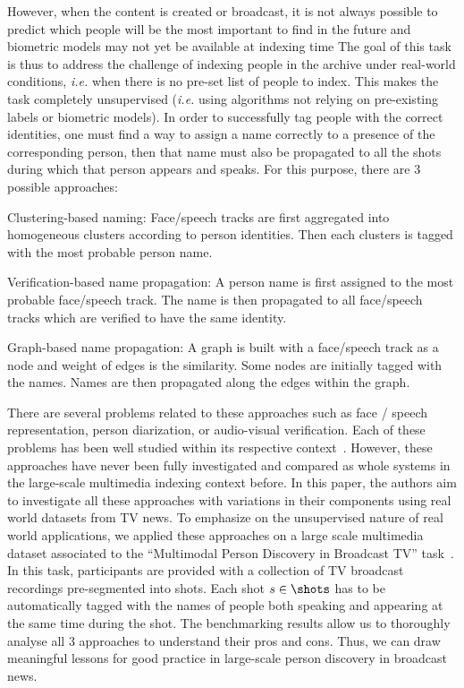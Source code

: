 However, when the content is created or broadcast, it is not always possible to predict which people will be the most important to find in the future and biometric models may not yet be available at indexing time The goal of this task is thus to address the challenge of indexing people in the archive under real-world conditions, \emph{i.e.} when there is no pre-set list of people to index.
%
This makes the task completely unsupervised (\emph{i.e.} using algorithms not relying on pre-existing labels or biometric models).
%
In order to successfully tag people with the correct identities, one must find a way to assign a name correctly to a presence of the corresponding person, then that name must also be propagated to all the shots during which that person appears and speaks. For this purpose, there are 3 possible approaches:
\begin{compactitem}
\item{Clustering-based naming: Face/speech tracks are first aggregated into homogeneous clusters according to person identities. Then each clusters is tagged with the most probable person name.}
\item{Verification-based name propagation: A person name is first assigned to the most probable face/speech track. The name is then propagated to all face/speech tracks which are verified to have the same identity.}
\item{Graph-based name propagation: A graph is built with a face/speech track as a node and weight of edges is the similarity. Some nodes are initially tagged with the names. Names are then propagated along the edges within the graph.}
\end{compactitem}

There are several problems related to these approaches such as face / speech representation, person diarization, or audio-visual verification. Each of these problems has been well studied within its respective context~\cite{recog,veri,rep}. 
%
However, these approaches have never been fully investigated and compared as whole systems in the large-scale multimedia indexing context before. In this paper, the authors aim to investigate all these approaches with variations in their components using real world datasets from TV news. 
%
To emphasize on the unsupervised nature of real world applications, we applied these approaches on a large scale multimedia dataset associated to the ``Multimodal Person Discovery in Broadcast TV'' task~\cite{POIGNANT--MEDIAEVAL--2015,bredin2016mediaeval}. In this task, participants are provided with a collection of TV broadcast recordings pre-segmented into shots. Each shot $s \in \shots$ has to be automatically tagged with the names of people both speaking and appearing at the same time during the shot.
%
The benchmarking results allow us to thoroughly analyse all 3 approaches to understand their pros and cons. Thus, we can draw meaningful lessons for good practice in large-scale person discovery in broadcast news.

\endinput
